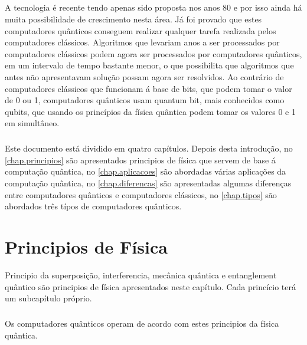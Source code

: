 \documentclass{report}
\begin{document}
 \paragraph{}A tecnologia é recente tendo apenas sido proposta nos anos 80 e por isso ainda há muita possibilidade de crescimento nesta área. Já foi provado que estes computadores quânticos conseguem realizar qualquer tarefa realizada pelos computadores clássicos. Algoritmos que levariam anos a ser processados por computadores clássicos podem agora ser processados por computadores quânticos, em um intervalo de tempo bastante menor, o que possibilita que algoritmos que antes não apresentavam solução possam agora ser resolvidos. Ao contrário de computadores clássicos que funcionam á base de bits, que podem tomar o valor de 0 ou 1, computadores quânticos usam quantum bit, mais conhecidos como qubits, que usando os princípios da física quântica podem tomar os valores 0 e 1 em simultâneo.
\paragraph{}Este documento está dividido em quatro capítulos.
Depois desta introdução,
no \autoref{chap.principios} são apresentados principios de física que servem de base á computação quântica,
no \autoref{chap.aplicacoes} são abordadas várias aplicações da computação quântica,
no \autoref{chap.diferencas} são apresentadas algumas diferenças entre computadores quânticos e computadores clássicos,
no \autoref{chap.tipos} são abordados três típos de computadores quânticos.


\chapter{Principios de Física}
\label{chap.principios}
Principio da superposição, interferencia, mecânica quântica e entanglement quântico são principios de física apresentados neste capítulo. Cada princício terá
um subcapítulo próprio.
\paragraph{}Os computadores quânticos operam de acordo com estes principios da física quântica.
\end{document}
